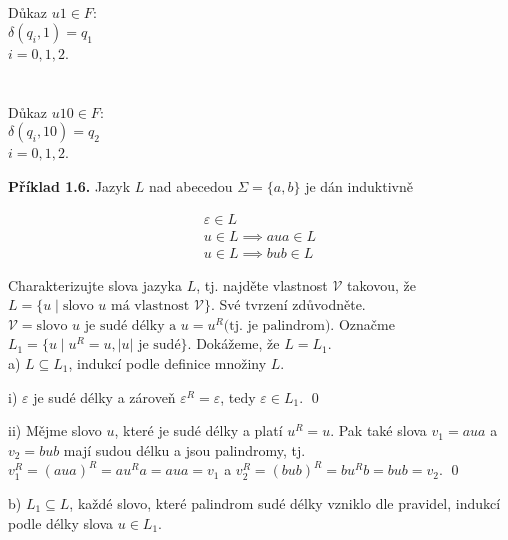 \documentclass[11pt]{article}
\begin{document}
\begin{multicols}{2}
\begin{multicols}{2}
            \columnbreak %
            \section*{}
                Důkaz $u1 \in F:$\\
                $\delta(q_i, 1) = q_1$\\
                $i = 0, 1, 2$.
                \\
                \\
                \\
                Důkaz $u10 \in F:$\\
                $\delta(q_i, 10) = q_2$\\
                $i = 0, 1, 2$.
            
        \end{multicols}
    \end{multicols}
\newpage
\noindent
\textbf{Příklad 1.6.} Jazyk $L$ nad abecedou $\Sigma = \{a, b\}$ je dán induktivně

\begin{gather*}
    \varepsilon \in L \\
    u \in L \implies aua \in L \\
    u \in L \implies bub \in L
\end{gather*}

\noindent
Charakterizujte slova jazyka $L$, tj. najděte vlastnost $\mathcal{V}$ takovou, že $L = \{u \mid \text{slovo } u \text{ má vlastnost } \mathcal{V}\}$. Své tvrzení zdůvodněte.\\

\noindent
$\mathcal{V} = \text{slovo } u \text{ je sudé délky a } u = u^R \text{(tj. je palindrom).}$
Označme $L_1 = \{u \mid u^R = u, |u| \text{ je sudé}\}$. Dokážeme, že $L=L_1$.\\

\noindent
a) $L \subseteq L_1$, indukcí podle definice množiny $L$.

i) $\varepsilon$ je sudé délky a zároveň $\varepsilon^R = \varepsilon$, tedy $\varepsilon \in L_1$. \qed

ii) Mějme slovo $u$, které je sudé délky a platí $u^R = u$. Pak také slova $v_1 = aua$ a $v_2=bub$ mají sudou délku a jsou palindromy, tj. ${v_1^R = (aua)^R = au^Ra=aua=v_1}$ a ${v_2^R = (bub)^R = bu^Rb=bub=v_2}$. \qed

\noindent
b) $L_1 \subseteq L$, každé slovo, které palindrom sudé délky vzniklo dle pravidel, indukcí podle délky slova $u \in L_1$.
\end{document}
